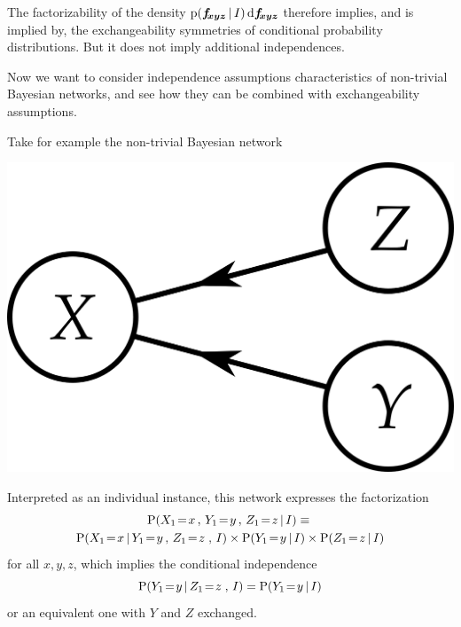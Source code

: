 \documentclass[\ifafour a4paper,12pt,\else a5paper,10pt,\fi%
onecolumn,oneside,article,%
british%
]{memoir}
\theoremstyle{remark}
\theoremstyle{innote}
\newcommand*{\di}{\mathrm{d}}%
\newcommand*{\pf}{\mathrm{p}}%
\newcommand*{\p}{\mathrm{P}}%
\renewcommand*{\|}[1][]{\nonscript\,#1\vert\nonscript\,\mathopen{}}
\renewcommand*{\=}{\TextOrMath\texteq\eq}
\newcommand*{\X}[1]{X_{#1}}
\newcommand*{\Y}[1]{Y_{#1}}
\newcommand*{\Z}[1]{Z_{#1}}
\newcommand*{\ffb}[1]{\bm{f_{\!#1}}}
\begin{document}
The factorizability of the density $\pf(\ffb{x y z}\|I)\,\di\ffb{x y z}$
therefore implies, and is implied by, the exchangeability symmetries of
conditional probability distributions. But it does not imply additional
independences.



Now we want to consider independence assumptions characteristics of
non-trivial Bayesian networks, and see how they can be combined with
exchangeability assumptions.

Take for example the non-trivial Bayesian network
\begin{center}%
\includegraphics[scale=0.5]{bayesnet3s.png}
\figcaption{\label{fig:indep_net}}  
\end{center}%
Interpreted as an individual instance, this network expresses the
factorization
\begin{multline}
  \label{eq:example_independence_individual}
  \p( \X{1}\=x \,,\, \Y{1}\=y \,,\,
  \Z{1}\=z \| I)  \equiv{}\\
  \p( \X{1}\=x \|  \Y{1}\=y \,,\,
  \Z{1}\=z\;,\,  I) \times %
  \p( \Y{1}\=y \| I) \times
  \p( \Z{1}\=z \|  I)
\end{multline}
for all $x, y, z$, which implies the conditional independence
\begin{equation}
  \label{eq:con_indep_yz}
  \p( \Y{1}\=y \| \Z{1}\=z\;,\,  I) =
  \p( \Y{1}\=y \|  I)
\end{equation}
or an equivalent one with $Y$ and $Z$ exchanged.
\end{document}
